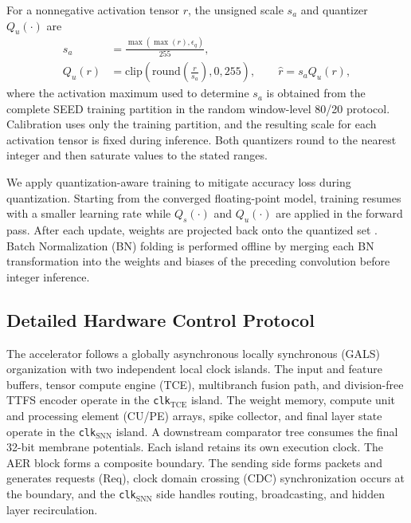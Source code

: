 ﻿\documentclass[12pt]{article}
\begin{document}
For a nonnegative activation tensor $r$, the unsigned scale $s_a$ and quantizer $Q_u(\cdot)$ are
\begin{equation}
\begin{aligned}
s_a &= \frac{\max\!\left(\max(r),\epsilon_q\right)}{255},\\
Q_u(r) &= \mathrm{clip}\!\left(\mathrm{round}\!\left(\frac{r}{s_a}\right),0,255\right),
\qquad \hat{r}=s_a Q_u(r),
\end{aligned}
\label{eq:quant_a}
\end{equation}
where the activation maximum used to determine $s_a$ is obtained from the complete SEED training partition in the random window-level 80/20 protocol. Calibration uses only the training partition, and the resulting scale for each activation tensor is fixed during inference. Both quantizers round to the nearest integer and then saturate values to the stated ranges.

We apply quantization-aware training to mitigate accuracy loss during quantization. Starting from the converged floating-point model, training resumes with a smaller learning rate while $Q_s(\cdot)$ and $Q_u(\cdot)$ are applied in the forward pass. After each update, weights are projected back onto the quantized set \cite{ref26}. Batch Normalization (BN) folding is performed offline by merging each BN transformation into the weights and biases of the preceding convolution before integer inference.



\subsection{Detailed Hardware Control Protocol}
The accelerator follows a globally asynchronous locally synchronous (GALS) organization with two independent local clock islands. The input and feature buffers, tensor compute engine (TCE), multibranch fusion path, and division-free TTFS encoder operate in the \texttt{clk}$_{\mathrm{TCE}}$ island. The weight memory, compute unit and processing element (CU/PE) arrays, spike collector, and final layer state operate in the \texttt{clk}$_{\mathrm{SNN}}$ island. A downstream comparator tree consumes the final 32-bit membrane potentials. Each island retains its own execution clock. The AER block forms a composite boundary. The sending side forms packets and generates requests (Req), clock domain crossing (CDC) synchronization occurs at the boundary, and the \texttt{clk}$_{\mathrm{SNN}}$ side handles routing, broadcasting, and hidden layer recirculation.
\end{document}
